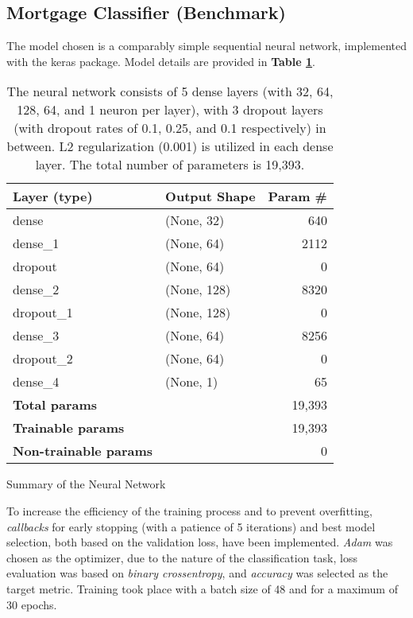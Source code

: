 
\subsection{Mortgage Classifier (Benchmark)}\label{subsec:Model_Training_and_Prediction}

The model chosen is a comparably simple sequential neural network, implemented with the keras package. Model details are provided in \textbf{Table \ref{tab:CH03_Model_Details}}.

\begin{table}[h]
    \centering
    \begin{tabularx}{\textwidth}{lXr}
    \hline
    \textbf{Layer (type)} & \textbf{Output Shape} & \textbf{Param \#} \\
    \hline
    dense & (None, 32) & 640 \\
    dense\_1 & (None, 64) & 2112 \\
    dropout & (None, 64) & 0 \\
    dense\_2 & (None, 128) & 8320 \\
    dropout\_1 & (None, 128) & 0 \\
    dense\_3 & (None, 64) & 8256 \\
    dropout\_2 & (None, 64) & 0 \\
    dense\_4 & (None, 1) & 65 \\
    \hline
    \textbf{Total params} & & 19,393 \\
    \textbf{Trainable params} & & 19,393 \\
    \textbf{Non-trainable params} & & 0 \\
    \hline
    \end{tabularx}
    \caption{Summary of the Neural Network}
    \caption*{The neural network consists of 5 dense layers (with 32, 64, 128, 64, and 1 neuron per layer), with 3 dropout layers (with dropout rates of 0.1, 0.25, and 0.1 respectively) in between. L2 regularization (0.001) is utilized in each dense layer. The total number of parameters is 19,393.}
    \label{tab:CH03_Model_Details}
\end{table}

To increase the efficiency of the training process and to prevent overfitting, \textit{callbacks} for early stopping (with a patience of 5 iterations) and best model selection, both based on the validation loss, have been implemented. 
\textit{Adam} was chosen as the optimizer, due to the nature of the classification task, loss evaluation was based on \textit{binary crossentropy}, and \textit{accuracy} was selected as the target metric. Training took place with a batch size of 48 and for a maximum of 30 epochs. 

